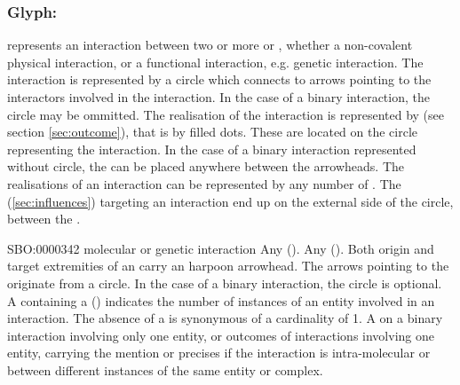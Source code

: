 
\subsubsection{Glyph: }\label{sec:interaction}

 represents an interaction between two or more  or , whether a non-covalent physical interaction, or a functional interaction, e.g. genetic interaction. The interaction is represented by a circle which connects to arrows pointing to the interactors involved in the interaction. In the case of a binary interaction, the circle may be ommitted. The realisation of the interaction is represented by  (see section \ref{sec:outcome}), that is by filled dots. These  are located on the circle representing the interaction. In the case of a binary interaction represented without circle, the  can be placed anywhere between the arrowheads. The realisations of an interaction can be represented by any number of . The  (\ref{sec:influences}) targeting an interaction end up on the external side of the circle, between the .

\begin{glyphDescription}
 \glyphSboTerm SBO:0000342 molecular or genetic interaction
 \glyphOrigin Any  ().
 \glyphTarget Any  ().
 \glyphEndPoint Both origin and target extremities of an  carry an harpoon arrowhead. The arrows pointing to the  originate from a circle. In the case of a binary interaction, the circle is optional. 
\glyphAux A  containing a  () indicates the number of instances of an entity involved in an interaction. The absence of a  is synonymous of a cardinality of 1. A  on a binary interaction involving only one entity, or outcomes of interactions involving one entity, carrying the mention  or  precises if the interaction is intra-molecular or between different instances of the same entity or complex.
 \end{glyphDescription}

